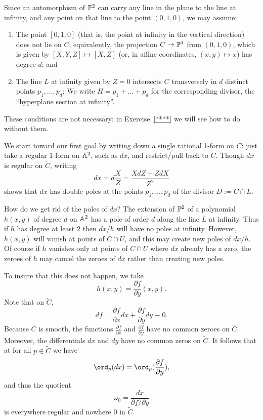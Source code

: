 Since an automorphism of $\PP^2$ can carry any line in the plane to the line at infinity, and any point on that line to the point $(0,1,0)$, we may assume:
\begin{enumerate}
\item The point $[0,1,0]$ (that is, the point at infinity in the vertical direction) does not lie on $C$; equivalently,  the projection $C \to \PP^1$ from $(0,1,0)$, which is given by $[X,Y,Z] \mapsto [X,Z]$ (or, in affine coordinates, $(x,y) \mapsto x$)  has degree $d$; and
\item The line $L$ at infinity given by $Z = 0$ intersects $C$ transversely in $d$ distinct points $p_1, \dots, p_d$; We write $H = p_1+ \dots +p_d$ for the corresponding divisor, the ``hyperplane section at infinity''.
\end{enumerate}

These conditions are not necessary: in Exercise~\ref{****} we will see how to do  without them.
 
We start toward our first goal by writing down a single rational 1-form on $C$: just take a regular 1-form on $\AA^2$, such as $dx$, and restrict/pull back to $C$. Though $dx$ is regular on $\tilde C$, writing
$$
dx = d\frac{X}{Z} = \frac{X dZ+ Z dX}{Z^2}
$$
 shows that $dx$ has double poles at the points $p_1,\dots,p_d$ of the divisor $D := C \cap L$.
 
How do we get rid of the poles of $dx$? The extension of $\PP^2$ of a polynomial $h(x,y)$ of degree $d$ on
$\AA^2$ has a pole of order $d$ along the line $L$ at infinity. Thus if $h$ has degree at least 2 then $dx/h$ will have no poles at infinity. However, $h(x,y)$ will vanish at points of $C \cap U$, and this may create new poles of $dx/h$. Of course if $h$ vanishes only at  points of $C \cap U$ where $dx$ already has a zero, the zeroes of $h$ may cancel the zeroes of $dx$ rather than creating new poles.
 
 To insure that this does not happen, we take
 $$
 h(x,y) = \frac{\partial f}{\partial y}(x,y).
 $$
 Note that on $\tilde C$,
 $$
 df = \frac{\partial f}{\partial x}dx + \frac{\partial f}{\partial y}dy \equiv 0.
 $$
Because $C$ is smooth, the functions $\frac{\partial f}{\partial x}$ and $\frac{\partial f}{\partial y}$ have no common zeroes on $\tilde C$. Moreover, the differentials $dx$ and $dy$ have no common zeros on $\tilde C$. It follows that at for all $p \in \tilde C$ we  have
$$
\ord_p(dx) = \ord_p(\frac{\partial f}{\partial y}), 
$$ 
and thus the quotient 
$$
\omega_0 = \frac{dx}{\partial f/\partial y}
$$
is everywhere regular and nowhere 0 in $\tilde C$.

